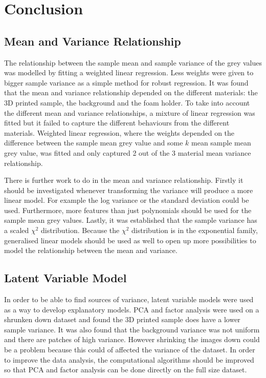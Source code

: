 \documentclass[12pt]{report}
\begin{document}
\chapter{Conclusion}

\section{Mean and Variance Relationship}
The relationship between the sample mean and sample variance of the grey values was modelled by fitting a weighted linear regression. Less weights were given to bigger sample variance as a simple method for robust regression. It was found that the mean and variance relationship depended on the different materials: the 3D printed sample, the background and the foam holder. To take into account the different mean and variance relationships, a mixture of linear regression was fitted but it failed to capture the different behaviours from the different materials. Weighted linear regression, where the weights depended on the difference between the sample mean grey value and some $k$ mean sample mean grey value, was fitted and only captured 2 out of the 3 material mean variance relationship.

There is further work to do in the mean and variance relationship. Firstly it should be investigated whenever transforming the variance will produce a more linear model. For example the log variance or the standard deviation could be used. Furthermore, more features than just polynomials should be used for the sample mean grey values. Lastly, it was established that the sample variance has a scaled $\chi^2$ distribution. Because the $\chi^2$ distribution is in the exponential family, generalised linear models \cite{mccullagh1989generalized} should be used as well to open up more possibilities to model the relationship between the mean and variance.

\section{Latent Variable Model}
In order to be able to find sources of variance, latent variable models were used as a way to develop explanatory models. PCA and factor analysis were used on a shrunken down dataset and found the 3D printed sample does have a lower sample variance. It was also found that the background variance was not uniform and there are patches of high variance. However shrinking the images down could be a problem because this could of affected the variance of the dataset. In order to improve the data analysis, the computational algorithms should be improved so that PCA and factor analysis can be done directly on the full size dataset.
\end{document}
